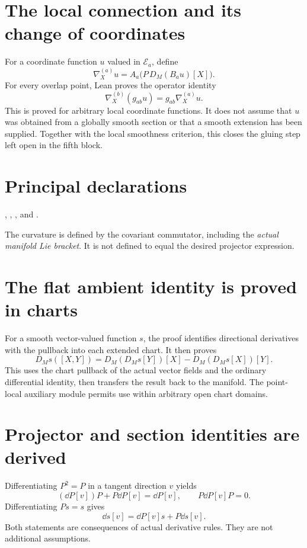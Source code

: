 \documentclass[10pt,letterpaper]{article}
\newcommand{\pageheading}[2]{\vspace*{2pt}{\small\color{ink}\textsc{#1}}\par\vspace{2pt}{\Large\bfseries #2}\par\vspace{4pt}}
\begin{document}
\section*{The local connection and its change of coordinates}
For a coordinate function $u$ valued in $\mathcal E_a$, define
\[
\nabla^{(a)}_Xu=A_a\bigl(P\,D_M(B_a u)[X]\bigr).
\]
For every overlap point, Lean proves the operator identity
\[
\boxed{\nabla^{(b)}_X(g_{ab}u)=g_{ab}\nabla^{(a)}_Xu.}
\]
This is proved for arbitrary local coordinate functions. It does not assume that $u$ was obtained from a globally smooth section or that a smooth extension has been supplied. Together with the local smoothness criterion, this closes the gluing step left open in the fifth block.

\section*{Principal declarations}
, ,
,
 and
.

\newpage
\pageheading{Actual manifold curvature}{From differentiated projectors to the two-form}
The curvature is defined by the covariant commutator, including the \emph{actual manifold Lie bracket}. It is not defined to equal the desired projector expression.

\section*{The flat ambient identity is proved in charts}
For a smooth vector-valued function $s$, the proof identifies directional derivatives with the pullback into each extended chart. It then proves
\[
D_Ms([X,Y])=D_M(D_Ms[Y])[X]-D_M(D_Ms[X])[Y].
\]
This uses the chart pullback of the actual vector fields and the ordinary differential identity, then transfers the result back to the manifold. The point-local auxiliary module permits use within arbitrary open chart domains.

\section*{Projector and section identities are derived}
Differentiating $P^2=P$ in a tangent direction $v$ yields
\[
(\dd P[v])P+P\dd P[v]=\dd P[v],
\qquad P\dd P[v]P=0.
\]
Differentiating $Ps=s$ gives
\[
\dd s[v]=\dd P[v]s+P\dd s[v].
\]
Both statements are consequences of actual derivative rules. They are not additional assumptions.
\end{document}
